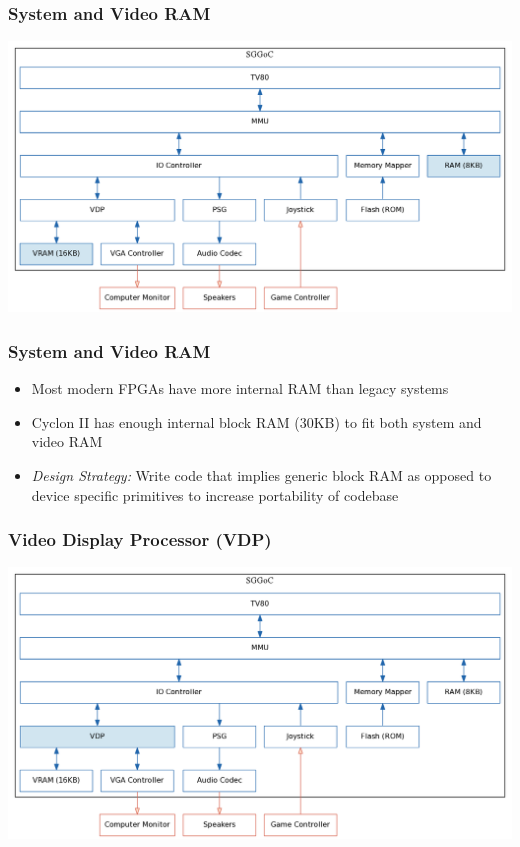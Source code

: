 \documentclass{beamer}
\newlength{\wideitemsep}
\let\olditem\item
\renewcommand{\item}{\setlength{\itemsep}{\wideitemsep}\olditem}
\begin{document}
\begin{frame}
    \frametitle{System and Video RAM}
    \begin{center}
        \includegraphics[width=\textwidth]{../block_diagrams/block_diagram_internal_ram.png}
    \end{center}
\end{frame}

\begin{frame}
    \frametitle{System and Video RAM}

    \begin{itemize}
        \item<1-> Most modern FPGAs have more internal RAM than legacy systems
        \item<2-> Cyclon II has enough internal block RAM (30KB) to fit both system and video RAM
        \item<3-> \emph{Design Strategy:} Write code that implies generic block RAM as opposed to device specific
            primitives to increase portability of codebase
    \end{itemize}
    \vspace{0.5cm}

\end{frame}

\begin{frame}
    \frametitle{Video Display Processor (VDP)}
    \begin{center}
        \includegraphics[width=\textwidth]{../block_diagrams/block_diagram_internal_vdp.png}
    \end{center}
\end{frame}
\end{document}
